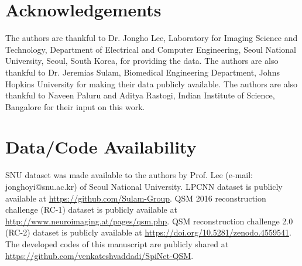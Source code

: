 \documentclass[sn-vancouver,Numbered]{sn-jnl}%
\begin{document}
\section*{Acknowledgements}

The authors are thankful to Dr. Jongho Lee, Laboratory for Imaging Science and Technology, Department of Electrical and Computer Engineering, Seoul National University, Seoul, South Korea, for providing the data. The authors are also thankful to Dr. Jeremias Sulam, Biomedical Engineering Department, Johns Hopkins University for making their data \cite{lai2020learned} publicly available. The authors are also thankful to Naveen Paluru and Aditya Rastogi, Indian Institute of Science, Bangalore for their input on this work. 

\section*{Data/Code Availability}
 SNU dataset was made available to the authors by Prof. Lee (e-mail:  jonghoyi@snu.ac.kr) of Seoul National University. LPCNN dataset is publicly available at \href{https://github.com/Sulam-Group/LPCNN}{https://github.com/Sulam-Group}\cite{lai2020learned}. 
QSM 2016 reconstruction challenge (RC-1) dataset is publicly available at \href{http://www.neuroimaging.at/pages/qsm.php}{http://www.neuroimaging.at/pages/qsm.php}\cite{langkammer2018quantitative}. QSM reconstruction challenge 2.0 (RC-2) dataset is publicly available at \href{https://doi.org/10.5281/zenodo.4559541}{https://doi.org/10.5281/zenodo.4559541}\cite{marques2021qsm}. The developed codes of this manuscript are publicly shared at \href{https://github.com/venkateshvaddadi/SpiNet-QSM}{https://github.com/venkateshvaddadi/SpiNet-QSM}.




%
\end{document}
